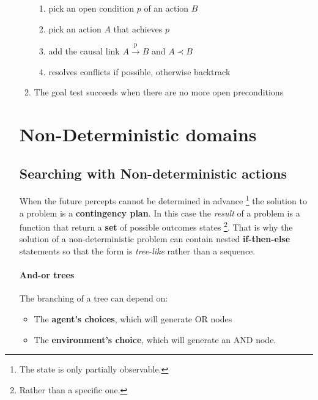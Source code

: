 \documentclass[5pt,a4paper]{article}
\begin{document}
\begin{itemize}
\begin{enumerate}
\begin{enumerate}
\item pick an open condition $p$ of an action $B$
\item pick an action $A$ that achieves $p$
\item add the causal link $A\xrightarrow{\text{p}} B$ and $A \prec B$
\item resolves conflicts if possible, otherwise backtrack
\end{enumerate}
\item The goal test succeeds when there are no more open preconditions

\end{enumerate}


\newpage

\section{Non-Deterministic domains}

\subsection{Searching with Non-deterministic actions}
When the future percepts cannot be determined in advance \footnote{The state is only partially observable.} the solution to a problem is a \textbf{contingency plan}. In this case the \textit{result} of a problem is a function that return a \textbf{set} of possible outcomes states \footnote{Rather than a specific one.}. That is why the solution of a non-deterministic problem can contain nested \textbf{if-then-else} statements so that the form is \textit{tree-like} rather than a sequence.

\paragraph{And-or trees}
The branching of a tree can depend on:
\begin{itemize}
\item The \textbf{agent's choices}, which will generate OR nodes
\item The \textbf{environment's choice}, which will generate an AND node.
\end{itemize}


\end{itemize}
\end{document}

